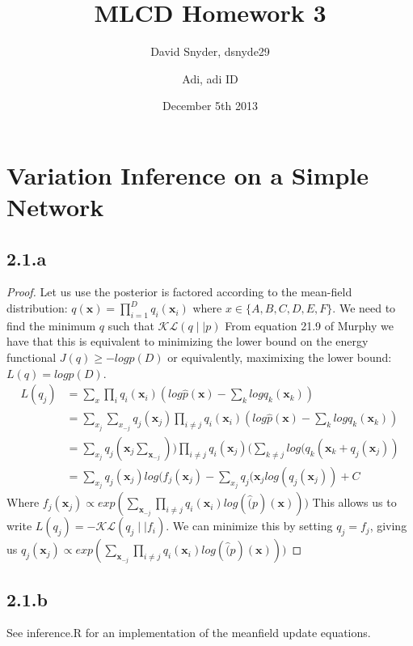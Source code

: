 \documentclass{article}
\title{MLCD Homework 3}
\date{December 5th 2013}
\author{David Snyder, dsnyde29
        \and Adi, adi ID}
\begin{document}
\maketitle

\section*{Variation Inference on a Simple Network}
\subsection*{2.1.a}

\begin{proof}
   Let us use the posterior is factored according to the mean-field distribution:
   $q(\textbf{x}) = \prod_{i=1}^{D} q_{i}(\textbf{x}_{i})$ 
   where $x \in \{A,B,C,D,E,F\}$.
   We need to find the minimum $q$ such that $\mathcal{K}\mathcal{L} (q \mid \mid p)$
   From equation 21.9 of Murphy we have that this is equivalent to minimizing the lower
   bound on the energy functional $J(q) \ge -log p(D)$ or equivalently, maximixing the
   lower bound: $L(q) = log p(D)$.
  \begin{align*}
     L(q_{j}) &= \sum_{x} \prod_{i} q_{i} (\textbf{x}_{i}) (log \hat{p} (\textbf{x}) - \sum_{k} log q_{k} (\textbf{x}_{k})) \\
     &= \sum_{x_{j}} \sum_{x_{-j}} q_{j} (\textbf{x}_{j}) \prod_{i \ne j} q_{i}(\textbf{x}_{i}) (log \hat{p}(\textbf{x}) - \sum_{k} log q_{k}(\textbf{x}_{k})) \\
     &= \sum_{x_{j}} q_{j}(\textbf{x}_{j} \sum_{\textbf{x}_{-j}})) \prod_{i \ne j} q_{i}(\textbf{x}_{j})(\sum_{k \ne j} log(q_{k}(\textbf{x}_{k} + q_{j}(\textbf{x}_{j})) \\
     &= \sum_{x_{j}} q_{j}(\textbf{x}_{j}) log(f_{j}(\textbf{x}_{j}) - \sum_{x_{j}} q_{j}(\textbf{x}_{j} log(q_{j}(\textbf{x}_{j})) + C
 \end{align*}
 Where $f_{j}(\textbf{x}_{j}) \propto exp(\sum_{\textbf{x}_{-j}} \prod_{i \ne j } q_{i}(\textbf{x}_{i}) log( \hat(p)(\textbf{x})))$
 This allows us to write $L(q_{j}) = - \mathcal{K} \mathcal{L} (q_{j} \mid \mid f_{i})$. We can minimize this by setting $q_{j} = f_{j}$,
 giving us $q_{j}(\textbf{x}_{j}) \propto exp(\sum_{\textbf{x}_{-j}} \prod_{i \ne j } q_{i}(\textbf{x}_{i}) log( \hat(p)(\textbf{x})))$
\end{proof}


\subsection*{2.1.b}
See inference.R for an implementation of the meanfield update equations.
\end{document}
